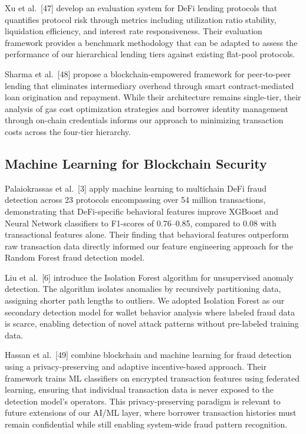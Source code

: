\documentclass[12pt,a4paper]{report}
\begin{document}
Xu et al.~[47] develop an evaluation system for DeFi lending protocols that quantifies protocol risk through metrics including utilization ratio stability, liquidation efficiency, and interest rate responsiveness. Their evaluation framework provides a benchmark methodology that can be adapted to assess the performance of our hierarchical lending tiers against existing flat-pool protocols.

Sharma et al.~[48] propose a blockchain-empowered framework for peer-to-peer lending that eliminates intermediary overhead through smart contract-mediated loan origination and repayment. While their architecture remains single-tier, their analysis of gas cost optimization strategies and borrower identity management through on-chain credentials informs our approach to minimizing transaction costs across the four-tier hierarchy.

\subsection{Machine Learning for Blockchain Security}

Palaiokrassas et al.~[3] apply machine learning to multichain DeFi fraud detection across 23 protocols encompassing over 54 million transactions, demonstrating that DeFi-specific behavioral features improve XGBoost and Neural Network classifiers to F1-scores of 0.76--0.85, compared to 0.08 with transactional features alone. Their finding that behavioral features outperform raw transaction data directly informed our feature engineering approach for the Random Forest fraud detection model.

Liu et al.~[6] introduce the Isolation Forest algorithm for unsupervised anomaly detection. The algorithm isolates anomalies by recursively partitioning data, assigning shorter path lengths to outliers. We adopted Isolation Forest as our secondary detection model for wallet behavior analysis where labeled fraud data is scarce, enabling detection of novel attack patterns without pre-labeled training data.

Hassan et al.~[49] combine blockchain and machine learning for fraud detection using a privacy-preserving and adaptive incentive-based approach. Their framework trains ML classifiers on encrypted transaction features using federated learning, ensuring that individual transaction data is never exposed to the detection model's operators. This privacy-preserving paradigm is relevant to future extensions of our AI/ML layer, where borrower transaction histories must remain confidential while still enabling system-wide fraud pattern recognition.
\end{document}
